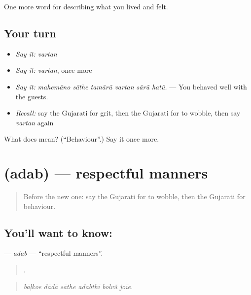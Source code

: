 \begin{grammarlens}[title={What you've built}]
One more word for describing what you lived and felt.
\end{grammarlens}

\subsection*{Your turn}
\begin{itemize}
\raggedright
  \item \emph{Say it:} \emph{vartan}
  \item \emph{Say it:} \emph{vartan}, once more
  \item \emph{Say it:} \emph{mahemāno sāthe tamārũ vartan sārũ hatũ.} — You behaved well with the guests.
  \item \emph{Recall:} say the Gujarati for grit, then the Gujarati for to wobble, then say \emph{vartan} again
\end{itemize}

\begin{tcolorbox}[breakable,colback=teal!4,colframe=teal!35!black,title={Before you move on}]
What does  mean? (\textquotedblleft{}Behaviour\textquotedblright{}.) Say it once more.
\end{tcolorbox}
\section[\texorpdfstring{\gu{અદબ} (adab)}{અદબ (adab)}]{ (adab) — respectful manners}

\label{lesson:GU-C467-adab}



\begin{quote}
Before the new one: say the Gujarati for to wobble, then the Gujarati for behaviour.
\end{quote}

\subsection*{You'll want to know: }
\textbf{} — \emph{adab} — \textquotedblleft{}respectful manners\textquotedblright{}.

\begin{quote}
     .
\end{quote}

\begin{quote}
\emph{bāḷkoe dādā sāthe adabthī bolvũ joīe.}
\end{quote}

